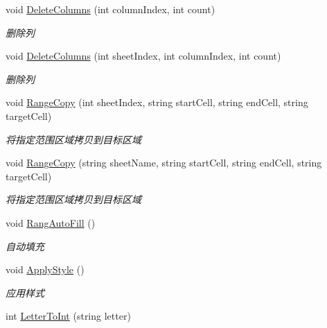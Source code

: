 \begin{DoxyCompactItemize}
void \hyperlink{class_x_c_l_net_tools_1_1_office_1_1_excel_handler_1_1_excel_helper_ac7aaa8ea8f54115213a89c1aecaf4063}{Delete\+Columns} (int column\+Index, int count)
\begin{DoxyCompactList}\small\item\em 删除列 \end{DoxyCompactList}\item 
void \hyperlink{class_x_c_l_net_tools_1_1_office_1_1_excel_handler_1_1_excel_helper_ace21012f5684de3daa81e9869ddf2183}{Delete\+Columns} (int sheet\+Index, int column\+Index, int count)
\begin{DoxyCompactList}\small\item\em 删除列 \end{DoxyCompactList}\item 
void \hyperlink{class_x_c_l_net_tools_1_1_office_1_1_excel_handler_1_1_excel_helper_aad980390731bd9f89b354593431c90af}{Range\+Copy} (int sheet\+Index, string start\+Cell, string end\+Cell, string target\+Cell)
\begin{DoxyCompactList}\small\item\em 将指定范围区域拷贝到目标区域 \end{DoxyCompactList}\item 
void \hyperlink{class_x_c_l_net_tools_1_1_office_1_1_excel_handler_1_1_excel_helper_a5bb84e8bacd04617b991c45e6dbd9edc}{Range\+Copy} (string sheet\+Name, string start\+Cell, string end\+Cell, string target\+Cell)
\begin{DoxyCompactList}\small\item\em 将指定范围区域拷贝到目标区域 \end{DoxyCompactList}\item 
void \hyperlink{class_x_c_l_net_tools_1_1_office_1_1_excel_handler_1_1_excel_helper_a22547178f56c46f8d2feda22046e685b}{Rang\+Auto\+Fill} ()
\begin{DoxyCompactList}\small\item\em 自动填充 \end{DoxyCompactList}\item 
void \hyperlink{class_x_c_l_net_tools_1_1_office_1_1_excel_handler_1_1_excel_helper_af2d165d931af0110263a12fcbb0c5cb2}{Apply\+Style} ()
\begin{DoxyCompactList}\small\item\em 应用样式 \end{DoxyCompactList}\item 
int \hyperlink{class_x_c_l_net_tools_1_1_office_1_1_excel_handler_1_1_excel_helper_ad9a762e98014d248246dc38122cdea64}{Letter\+To\+Int} (string letter)

\end{DoxyCompactItemize}
